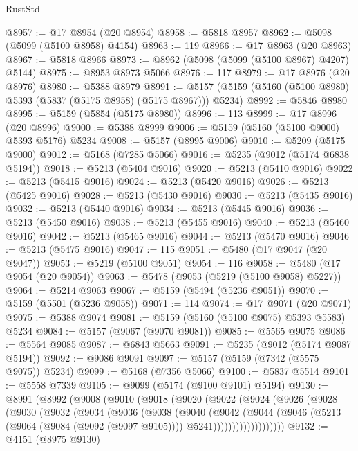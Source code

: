 \begin{lexlean}{RustStd}
\begin{coremodule}
@8957 := @17 @8954 (@20 @8954)
@8958 := @5818 @8957
@8962 := @5098 (@5099 (@5100 @8958) @4154)
@8963 := 119
@8966 := @17 @8963 (@20 @8963)
@8967 := @5818 @8966
@8973 := @8962 (@5098 (@5099 (@5100 @8967) @4207) @5144)
@8975 := @8953 @8973 @5066
@8976 := 117
@8979 := @17 @8976 (@20 @8976)
@8980 := @5388 @8979
@8991 := @5157 (@5159 (@5160 (@5100 @8980) @5393 (@5837 (@5175 @8958) (@5175 @8967))) @5234)
@8992 := @5846 @8980
@8995 := @5159 (@5854 (@5175 @8980))
@8996 := 113
@8999 := @17 @8996 (@20 @8996)
@9000 := @5388 @8999
@9006 := @5159 (@5160 (@5100 @9000) @5393 @5176) @5234
@9008 := @5157 (@8995 @9006)
@9010 := @5209 (@5175 @9000)
@9012 := @5168 (@7285 @5066)
@9016 := @5235 (@9012 (@5174 @6838 @5194))
@9018 := @5213 (@5404 @9016)
@9020 := @5213 (@5410 @9016)
@9022 := @5213 (@5415 @9016)
@9024 := @5213 (@5420 @9016)
@9026 := @5213 (@5425 @9016)
@9028 := @5213 (@5430 @9016)
@9030 := @5213 (@5435 @9016)
@9032 := @5213 (@5440 @9016)
@9034 := @5213 (@5445 @9016)
@9036 := @5213 (@5450 @9016)
@9038 := @5213 (@5455 @9016)
@9040 := @5213 (@5460 @9016)
@9042 := @5213 (@5465 @9016)
@9044 := @5213 (@5470 @9016)
@9046 := @5213 (@5475 @9016)
@9047 := 115
@9051 := @5480 (@17 @9047 (@20 @9047))
@9053 := @5219 (@5100 @9051)
@9054 := 116
@9058 := @5480 (@17 @9054 (@20 @9054))
@9063 := @5478 (@9053 (@5219 (@5100 @9058) @5227))
@9064 := @5214 @9063
@9067 := @5159 (@5494 (@5236 @9051))
@9070 := @5159 (@5501 (@5236 @9058))
@9071 := 114
@9074 := @17 @9071 (@20 @9071)
@9075 := @5388 @9074
@9081 := @5159 (@5160 (@5100 @9075) @5393 @5583) @5234
@9084 := @5157 (@9067 (@9070 @9081))
@9085 := @5565 @9075
@9086 := @5564 @9085
@9087 := @6843 @5663
@9091 := @5235 (@9012 (@5174 @9087 @5194))
@9092 := @9086 @9091
@9097 := @5157 (@5159 (@7342 (@5575 @9075)) @5234)
@9099 := @5168 (@7356 @5066)
@9100 := @5837 @5514
@9101 := @5558 @7339
@9105 := @9099 (@5174 (@9100 @9101) @5194)
@9130 := @8991
    (@8992
      (@9008
        (@9010
          (@9018
            (@9020
              (@9022
                (@9024
                  (@9026
                    (@9028
                      (@9030
                        (@9032
                          (@9034
                            (@9036
                              (@9038
                                (@9040
                                  (@9042
                                    (@9044
                                      (@9046
                                        (@5213
                                          (@9064 (@9084 (@9092 (@9097 @9105))))
                                          @5241)))))))))))))))))))
@9132 := @4151 (@8975 @9130)

\end{coremodule}
\end{lexlean}

